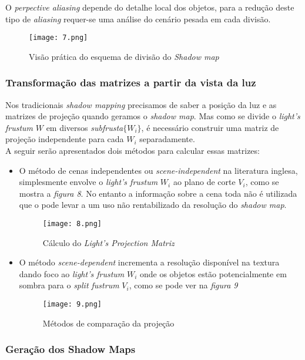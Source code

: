 \documentclass[12pt]{article}
\begin{document}
O {\it perpective aliasing} depende do detalhe local dos objetos, para a redução deste tipo de {\it aliasing} requer-se uma análise do cenário pesada em cada divisão. 

\begin{figure}[!h]
\centering
\texttt{[image: 7.png]}
\caption{Visão prática do esquema de divisão do {\it Shadow map}}
\label{img7}
\end{figure}


\newpage
\subsubsection{Transformação das matrizes a partir da vista da luz}

\vspace{7 mm}
\hspace{7 mm}Nos tradicionais {\it shadow mapping} precisamos de saber a posição da luz e as matrizes de projeção quando geramos o {\it shadow map}. Mas como se divide o {\it light's frustum} $W$ em diversos {\it subfrusta}$\{W_i\}$, é necessário construir uma matriz de projeção independente para cada $W_i$ separadamente.\\

A seguir serão apresentados dois métodos para calcular essas matrizes:
\begin{itemize}
  \item O método de cenas independentes ou {\it scene-independent} na literatura inglesa, simplesmente envolve o {\it light's frustum} $W_i$ ao plano de corte $V_i$, como se mostra a {\it figura 8}. No entanto a informação sobre a cena toda não é utilizada que o pode levar a um uso não rentabilizado da resolução do {\it shadow map}.
\begin{figure}[!h]
\centering
\texttt{[image: 8.png]}
\caption{Cálculo do {\it Light's Projection Matriz}}
\label{img8}
\end{figure}
\newpage
\item O método {\it scene-dependent} incrementa a resolução disponível na textura dando foco ao {\it light's frustum } $W_i$  onde os objetos estão potencialmente em sombra para o {\it split fustrum} $V_i$, como se pode ver na {\it figura 9}
\begin{figure}[!h]
\centering
\texttt{[image: 9.png]}
\caption{Métodos de comparação da projeção}
\label{img9}
\end{figure}
\end{itemize}

\subsubsection{Geração dos Shadow Maps}
\end{document}
